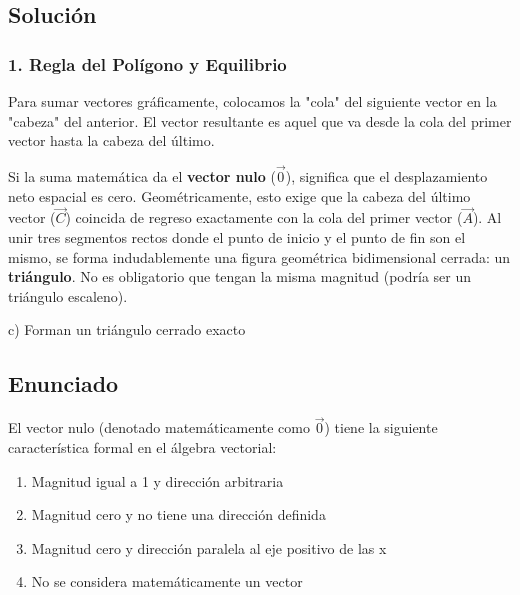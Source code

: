 \documentclass[12pt, a4paper]{article}
\begin{document}
\subsection*{Solución}

\subsubsection*{1. Regla del Polígono y Equilibrio}
Para sumar vectores gráficamente, colocamos la "cola" del siguiente vector en la "cabeza" del anterior. El vector resultante es aquel que va desde la cola del primer vector hasta la cabeza del último.

Si la suma matemática da el \textbf{vector nulo} ($\vec{0}$), significa que el desplazamiento neto espacial es cero. Geométricamente, esto exige que la cabeza del último vector ($\vec{C}$) coincida de regreso exactamente con la cola del primer vector ($\vec{A}$). 
Al unir tres segmentos rectos donde el punto de inicio y el punto de fin son el mismo, se forma indudablemente una figura geométrica bidimensional cerrada: un \textbf{triángulo}. 
No es obligatorio que tengan la misma magnitud (podría ser un triángulo escaleno).

\begin{tcolorbox}[colback=green!5!white, colframe=green!50!black, title=Respuesta Final]
\centering \Large c) Forman un triángulo cerrado exacto
\end{tcolorbox}

\newpage


\subsection*{Enunciado}
El vector nulo (denotado matemáticamente como $\vec{0}$) tiene la siguiente característica formal en el álgebra vectorial:
\begin{enumerate}[label=\alph*)]
    \item Magnitud igual a 1 y dirección arbitraria
    \item Magnitud cero y no tiene una dirección definida
    \item Magnitud cero y dirección paralela al eje positivo de las x
    \item No se considera matemáticamente un vector
\end{enumerate}
\end{document}
